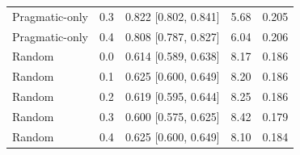 \begin{table}[t]
\begin{tabular}{llp{2.6cm}rr}
Pragmatic-only & 0.3 & 0.822 [0.802, 0.841] & 5.68 & 0.205 \\
Pragmatic-only & 0.4 & 0.808 [0.787, 0.827] & 6.04 & 0.206 \\
Random & 0.0 & 0.614 [0.589, 0.638] & 8.17 & 0.186 \\
Random & 0.1 & 0.625 [0.600, 0.649] & 8.20 & 0.186 \\
Random & 0.2 & 0.619 [0.595, 0.644] & 8.25 & 0.186 \\
Random & 0.3 & 0.600 [0.575, 0.625] & 8.42 & 0.179 \\
Random & 0.4 & 0.625 [0.600, 0.649] & 8.10 & 0.184 \\
\bottomrule
\end{tabular}
\end{table}
